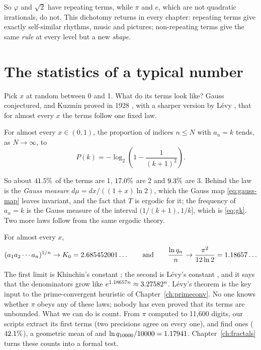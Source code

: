 So $\varphi$ and $\sqrt2$ have repeating terms, while $\pi$ and $e$, which are not quadratic irrationals, do not. This dichotomy returns in every chapter: repeating terms give exactly self-similar rhythms, music and pictures; non-repeating terms give the same \emph{rule} at every level but a new \emph{shape}.

\section{The statistics of a typical number}\label{sec:metric}

Pick $x$ at random between 0 and 1. What do its terms look like? Gauss conjectured, and Kuzmin proved in 1928 \citep{Kuzmin1928}, with a sharper version by Lévy \citep{Levy1929}, that for almost every $x$ the terms follow one fixed law.

\begin{theorem}\label{thm:gk}
For almost every $x \in (0,1)$, the proportion of indices $n \le N$ with $a_n = k$ tends, as $N \to \infty$, to
\begin{equation}\label{eq:gk}
  P(k) = -\log_2\!\left(1 - \frac{1}{(k+1)^2}\right).
\end{equation}
\end{theorem}

So about $41.5\%$ of the terms are 1, $17.0\%$ are 2 and $9.3\%$ are 3. Behind the law is the \emph{Gauss measure} $d\mu = dx/((1+x)\ln 2)$, which the Gauss map \eqref{eq:gauss-map} leaves invariant, and the fact that $T$ is ergodic for it; the frequency of $a_n = k$ is the Gauss measure of the interval $(1/(k+1), 1/k]$, which is \eqref{eq:gk}. Two more laws follow from the same ergodic theory.

\begin{theorem}\label{thm:khinchin-levy}
For almost every $x$,
\begin{equation}\label{eq:khinchin}
  (a_1 a_2 \cdots a_n)^{1/n} \to K_0 = 2.685452001\ldots \qquad\text{and}\qquad \frac{\ln q_n}{n} \to \frac{\pi^2}{12 \ln 2} = 1.18657\ldots
\end{equation}
\end{theorem}

The first limit is Khinchin's constant \citep{Khintchine1935}; the second is Lévy's constant \citep{Levy1936}, and it says that the denominators grow like $e^{1.18657 n} \approx 3.27582^n$. Lévy's theorem is the key input to the prime-convergent heuristic of Chapter~\ref{ch:primeconv}. No one knows whether $\pi$ obeys any of these laws; nobody has even proved that its terms are unbounded. What we can do is count. From $\pi$ computed to 11{,}600 digits, our scripts extract its first \NT{} terms (two precisions agree on every one), and find \GKones{} ones ($42.1\%$), a geometric mean of \GeoMean{} and $\ln q_{10000}/10000 = 1.17941$. Chapter~\ref{ch:fractals} turns these counts into a formal test.

